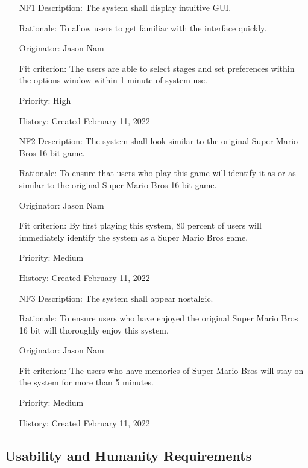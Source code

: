 \documentclass[12pt, titlepage]{article}
\begin{document}
\begin{itemize}
    
	\item[NF1] 
        Description: The system shall display intuitive GUI.
        
        Rationale: To allow users to get familiar with the interface quickly.
        
        Originator: Jason Nam
        
        Fit criterion: The users are able to select stages and set preferences within the options window within 1 minute of system use.
        
        Priority: High
        
        History: Created February 11, 2022
        
    \item[NF2]
        Description: The system shall look similar to the original Super Mario Bros 16 bit game.
        
        Rationale: To ensure that users who play this game will identify it as or as similar to the original Super Mario Bros 16 bit game.
        
        Originator: Jason Nam
        
        Fit criterion: By first playing this system, 80 percent of users will immediately identify the system as a Super Mario Bros game.
        
        Priority: Medium
        
        History: Created February 11, 2022
        
    \item[NF3]
        Description: The system shall appear nostalgic.
        
        Rationale: To ensure users who have enjoyed the original Super Mario Bros 16 bit will thoroughly enjoy this system.
        
        Originator: Jason Nam
        
        Fit criterion: The users who have memories of Super Mario Bros will stay on the system for more than 5 minutes.
        
        Priority: Medium
        
        History: Created February 11, 2022
        
\end{itemize}

\subsection{Usability and Humanity Requirements}
\end{document}
